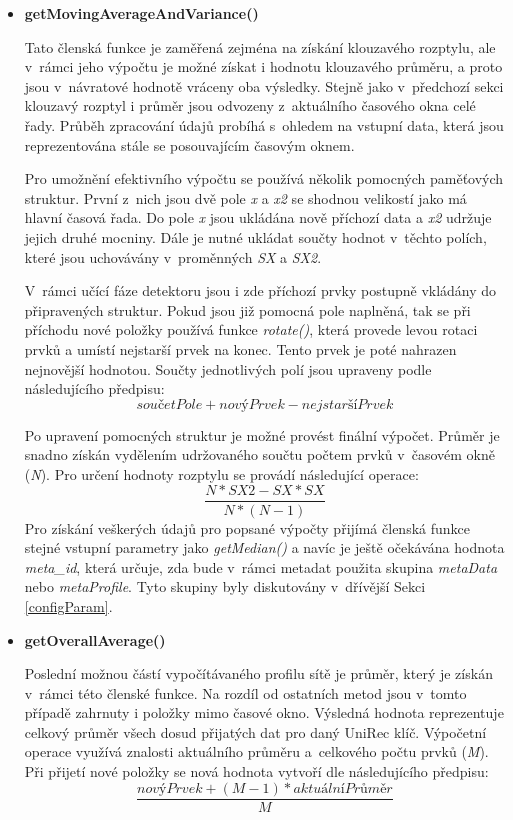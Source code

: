 \begin{itemize}
 \item \textbf{getMovingAverageAndVariance()}%
 
 Tato členská funkce je zaměřená zejména na získání klouzavého rozptylu, ale v~rámci jeho výpočtu je možné
 získat i hodnotu klouzavého průměru, a proto jsou v~návratové hodnotě vráceny oba výsledky.
 Stejně jako v~předchozí sekci klouzavý rozptyl i průměr jsou odvozeny z~aktuálního časového
 okna celé řady.
 Průběh
 zpracování údajů probíhá s~ohledem na vstupní data, která 
 jsou reprezentována stále se posouvajícím časovým oknem. 
 
 Pro umožnění efektivního výpočtu se používá několik pomocných paměťových struktur. První z~nich 
 jsou dvě pole \textit{x} a \textit{x2} se shodnou velikostí jako má hlavní časová řada. Do pole
 \textit{x} jsou ukládána
 nově příchozí data a \textit{x2} udržuje jejich druhé mocniny. Dále je nutné ukládat součty
 hodnot v~těchto polích, které jsou uchovávány v~proměnných \textit{SX} a \textit{SX2}.
 
 V~rámci učící fáze detektoru jsou i zde příchozí prvky postupně vkládány do připravených struktur.
 Pokud jsou již pomocná pole naplněná, tak se při příchodu nové položky používá funkce
 \textit{rotate()}, která provede levou rotaci prvků a umístí nejstarší prvek na konec. Tento
 prvek je poté nahrazen nejnovější hodnotou. Součty jednotlivých polí jsou upraveny podle 
 následujícího předpisu:  
 \[
  součetPole + novýPrvek - nejstaršíPrvek
\]
 
 Po upravení pomocných struktur je možné provést finální výpočet. Průměr je snadno získán vydělením
 udržovaného součtu počtem prvků v~časovém okně (\textit{N}). Pro určení hodnoty rozptylu se provádí
 následující operace:
\[
   \frac{N * SX2 - SX * SX}{N * (N - 1)}
\]
Pro získání veškerých údajů pro popsané výpočty přijímá členská funkce stejné vstupní parametry
jako \textit{getMedian()} a navíc je ještě očekávána hodnota \textit{meta\_id}, která určuje, 
zda bude v~rámci metadat použita skupina \textit{metaData} nebo \textit{metaProfile}.
Tyto skupiny byly diskutovány v~dřívější Sekci \ref{configParam}.


 \item \textbf{getOverallAverage()}%
 
 Poslední možnou částí vypočítávaného profilu sítě je průměr, který je získán v~rámci 
 této členské funkce. Na rozdíl od ostatních metod jsou v~tomto případě zahrnuty i položky 
 mimo časové okno. Výsledná hodnota reprezentuje celkový průměr všech dosud přijatých dat pro 
 daný UniRec klíč. Výpočetní operace využívá znalosti aktuálního průměru a~celkového počtu prvků
 (\textit{M}). Při přijetí 
 nové položky se nová hodnota vytvoří dle následujícího předpisu:
 \[
 \frac{novýPrvek + (M - 1) * aktuálníPrůměr}{M} 
 \]


\end{itemize}
